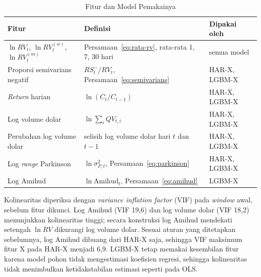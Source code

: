\begin{table}[htbp]
  \caption{Fitur dan Model Pemakainya}
  \label{tab:fitur}
  \centering
  \begingroup
  \small
  \begin{tabular}{|p{}|p{}|p{}|}
    \hline
    \textbf{Fitur} & \textbf{Definisi} & \textbf{Dipakai oleh} \\
    \hline
    $\ln RV_t$, $\ln RV^{(w)}_t$, $\ln RV^{(m)}_t$ &
    Persamaan~\eqref{eq:rata-rv}, rata-rata 1, 7, 30 hari & semua model \\
    \hline
    Proporsi semivarians negatif & $RS^-_t / RV_t$,
    Persamaan~\eqref{eq:semivarians} & HAR-X, LGBM-X \\
    \hline
    \textit{Return} harian & $\ln(C_t / C_{t-1})$ & HAR-X, LGBM-X \\
    \hline
    Log volume dolar & $\ln \sum_i QV_{t,i}$ & HAR-X, LGBM-X \\
    \hline
    Perubahan log volume dolar & selisih log volume dolar hari $t$ dan $t-1$ &
    HAR-X, LGBM-X \\
    \hline
    Log \textit{range} Parkinson & $\ln \sigma^2_{P,t}$,
    Persamaan~\eqref{eq:parkinson} & HAR-X, LGBM-X \\
    \hline
    Log Amihud & $\ln \text{Amihud}_t$, Persamaan~\eqref{eq:amihud} &
    LGBM-X \\
    \hline
  \end{tabular}
  \endgroup
\end{table}

Kolinearitas diperiksa dengan \textit{variance inflation factor} (VIF) pada
\textit{window} awal, sebelum fitur dikunci. Log Amihud (VIF 19,6) dan log
volume dolar (VIF 18,2) menunjukkan kolinearitas tinggi; secara konstruksi log
Amihud mendekati setengah $\ln RV$ dikurangi log volume dolar. Sesuai aturan
yang ditetapkan sebelumnya, log Amihud dibuang dari HAR-X saja, sehingga VIF
maksimum fitur X pada HAR-X menjadi 6,9. %
LGBM-X tetap memakai kesembilan fitur karena model pohon tidak mengestimasi
koefisien regresi, sehingga kolinearitas tidak menimbulkan ketidakstabilan
estimasi seperti pada OLS.

